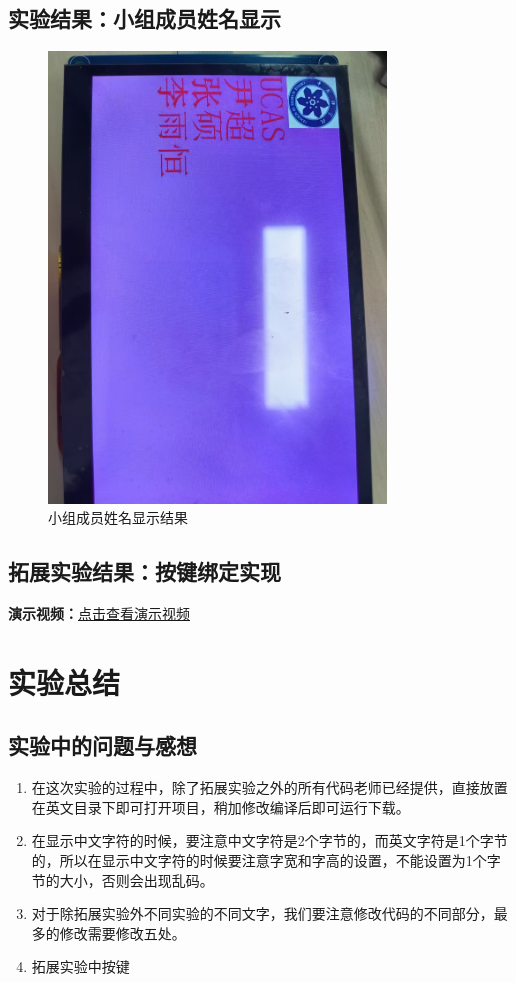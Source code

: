 \documentclass[UTF8]{article}
\theoremstyle{MyLineTheoremStyle} %
\theoremstyle{MyBlockTheoremStyle} %
\theoremstyle{MySubsubsectionStyle} %
\begin{document}
\subsection{实验结果：小组成员姓名显示}
\noindent
\begin{figure}[H]
    \centering
    \includegraphics[width=0.8\textwidth]{members.jpg}
    \caption{小组成员姓名显示结果}
    \label{fig:小组成员姓名显示结果}
\end{figure}

\subsection{拓展实验结果：按键绑定实现}
\noindent
\textbf{演示视频：}\href{}{点击查看演示视频}

\section{实验总结}

\subsection{实验中的问题与感想}

\begin{enumerate}
\item 在这次实验的过程中，除了拓展实验之外的所有代码老师已经提供，直接放置在英文目录下即可打开项目，稍加修改编译后即可运行下载。
\item 在显示中文字符的时候，要注意中文字符是2个字节的，而英文字符是1个字节的，所以在显示中文字符的时候要注意字宽和字高的设置，不能设置为1个字节的大小，否则会出现乱码。
\item 对于除拓展实验外不同实验的不同文字，我们要注意修改代码的不同部分，最多的修改需要修改五处。
\item 拓展实验中按键
\end{enumerate}
\end{document}
